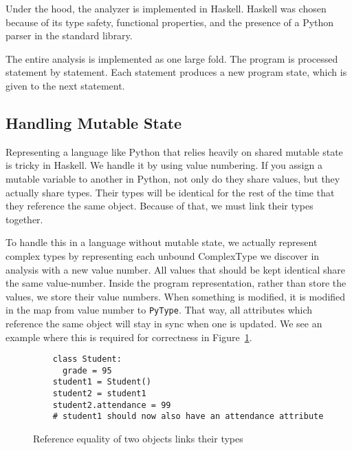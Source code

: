 \documentclass{article}[12pt]
\begin{document}
Under the hood, the analyzer is implemented in Haskell. Haskell was chosen because of its type
safety, functional properties, and the presence of a Python parser in the standard library. 

The entire analysis is implemented as one large fold. The program is processed statement by statement. Each
statement produces a new program state, which is given to the next statement.

\subsection{Handling Mutable State}

Representing a language like Python that relies heavily on shared mutable state is tricky in
Haskell. We handle it by using value numbering. If you assign a mutable variable to another in
Python, not only do they share values, but they actually share types. Their types will be identical
for the rest of the time that they reference the same object. Because of that, we must link their
types together. 

To handle this in a language without mutable state, we actually represent complex types by
representing each unbound ComplexType we discover in analysis with a new value number. All values
that should be kept identical share the same value-number. Inside the program representation, rather
than store the values, we store their value numbers. When something is modified, it is modified in
the map from value number to \verb=PyType=.  That way, all attributes which reference the same
object will stay in sync when one is updated.  We see an example where this is required for
correctness in Figure~\ref{fig:mutablestate}.

\begin{figure}
\begin{verbatim}
    class Student:
      grade = 95
    student1 = Student()
    student2 = student1
    student2.attendance = 99
    # student1 should now also have an attendance attribute
\end{verbatim}
\caption{Reference equality of two objects links their types}
\label{fig:mutablestate}
\end{figure}
\end{document}
